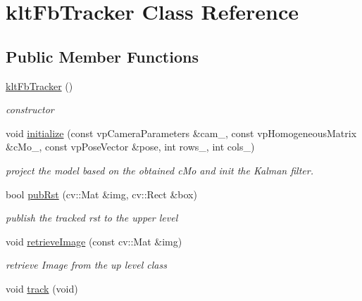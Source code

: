 \hypertarget{classkltFbTracker}{\section{klt\-Fb\-Tracker \-Class \-Reference}
\label{classkltFbTracker}
}
\subsection*{\-Public \-Member \-Functions}
\begin{DoxyCompactItemize}
\item 
\hypertarget{classkltFbTracker_ad1cb6684fe1235e576acdda1f7595d63}{\hyperlink{classkltFbTracker_ad1cb6684fe1235e576acdda1f7595d63}{klt\-Fb\-Tracker} ()}\label{classkltFbTracker_ad1cb6684fe1235e576acdda1f7595d63}

\begin{DoxyCompactList}\small\item\em constructor \end{DoxyCompactList}\item 
void \hyperlink{classkltFbTracker_a9e81cb441cb49cdd064343cc19d7f002}{initialize} (const vp\-Camera\-Parameters \&cam\-\_\-, const vp\-Homogeneous\-Matrix \&c\-Mo\-\_\-, const vp\-Pose\-Vector \&pose, int rows\-\_\-, int cols\-\_\-)
\begin{DoxyCompactList}\small\item\em project the model based on the obtained c\-Mo and init the \-Kalman filter. \end{DoxyCompactList}\item 
bool \hyperlink{classkltFbTracker_a0873200aa663a771410ed98c86c0f82b}{pub\-Rst} (cv\-::\-Mat \&img, cv\-::\-Rect \&box)
\begin{DoxyCompactList}\small\item\em publish the tracked rst to the upper level \end{DoxyCompactList}\item 
void \hyperlink{classkltFbTracker_a4bcd62be59529e0bafd606f8bff6c414}{retrieve\-Image} (const cv\-::\-Mat \&img)
\begin{DoxyCompactList}\small\item\em retrieve \-Image from the up level class \end{DoxyCompactList}\item 
\hypertarget{classkltFbTracker_addf646a894f55485b2675009d95c1829}{void \hyperlink{classkltFbTracker_addf646a894f55485b2675009d95c1829}{track} (void)}\label{classkltFbTracker_addf646a894f55485b2675009d95c1829}


\end{DoxyCompactItemize}
